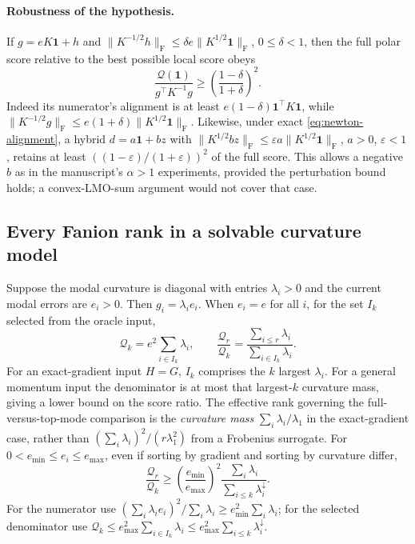 \documentclass[11pt]{article}
\newcommand{\F}[1]{\lVert #1\rVert_{\mathrm F}}
\begin{document}
\paragraph{Robustness of the hypothesis.}
If $g=eK\boldsymbol1+h$ and
$\F{K^{-1/2}h}\leq\delta e\F{K^{1/2}\boldsymbol1}$, $0\leq\delta<1$,
then the full polar score relative to the best possible local score obeys
\begin{equation}\label{eq:robust}
 \frac{\mathcal Q(\boldsymbol1)}{g^\top K^{-1}g}
 \geq\left(\frac{1-\delta}{1+\delta}\right)^2.
\end{equation}
Indeed its numerator's alignment is at least
$e(1-\delta)\boldsymbol1^\top K\boldsymbol1$, while
$\F{K^{-1/2}g}\leq e(1+\delta)\F{K^{1/2}\boldsymbol1}$.
Likewise, under exact \eqref{eq:newton-alignment}, a hybrid
$d=a\boldsymbol1+bz$ with
$\F{K^{1/2}bz}\leq\varepsilon a\F{K^{1/2}\boldsymbol1}$,
$a>0$, $\varepsilon<1$, retains at least
$((1-\varepsilon)/(1+\varepsilon))^2$ of the full score. This allows a
negative $b$ as in the manuscript's $\alpha>1$ experiments, provided the
perturbation bound holds; a convex-LMO-sum argument would not cover that case.

\subsection{Every Fanion rank in a solvable curvature model}

Suppose the modal curvature is diagonal with entries $\lambda_i>0$ and
the current modal errors are $e_i>0$. Then $g_i=\lambda_i e_i$.
When $e_i=e$ for all $i$, for the set $I_k$ selected from the oracle input,
\begin{equation}\label{eq:curvature-mass}
 \mathcal Q_k=e^2\sum_{i\in I_k}\lambda_i,\qquad
 \frac{\mathcal Q_r}{\mathcal Q_k}
 =\frac{\sum_{i\leq r}\lambda_i}{\sum_{i\in I_k}\lambda_i}.
\end{equation}
For an exact-gradient input $H=G$, $I_k$ comprises the $k$ largest
$\lambda_i$. For a general momentum input the denominator is at most that
largest-$k$ curvature mass, giving a lower bound on the score ratio.
The effective rank governing the full-versus-top-mode comparison is the
\emph{curvature mass} $\sum_i\lambda_i/\lambda_1$ in the exact-gradient
case, rather than
$(\sum_i\lambda_i)^2/(r\lambda_1^2)$ from a Frobenius surrogate.
For $0<e_{\min}\leq e_i\leq e_{\max}$, even if sorting by gradient and
sorting by curvature differ,
\begin{equation}\label{eq:comparable-errors}
 \frac{\mathcal Q_r}{\mathcal Q_k}
 \geq\left(\frac{e_{\min}}{e_{\max}}\right)^2
 \frac{\sum_i\lambda_i}{\sum_{i\leq k}\lambda_i^{\downarrow}}.
\end{equation}
For the numerator use
$(\sum_i\lambda_i e_i)^2/\sum_i\lambda_i
\geq e_{\min}^2\sum_i\lambda_i$; for the selected denominator use
$\mathcal Q_k\leq e_{\max}^2\sum_{i\in I_k}\lambda_i
\leq e_{\max}^2\sum_{i\leq k}\lambda_i^{\downarrow}$.
\end{document}
